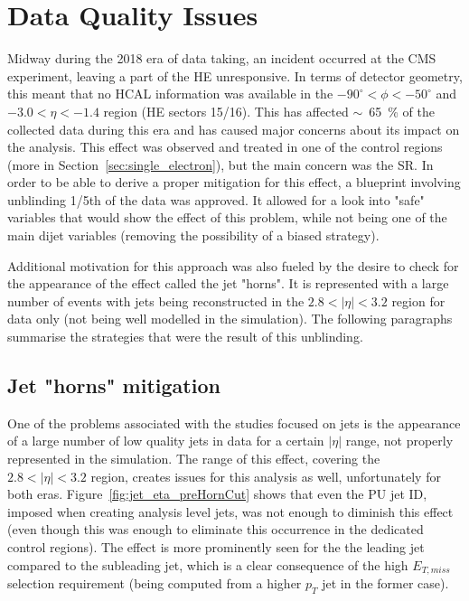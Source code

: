 \section{Data Quality Issues}
\label{sec:data_quality}
\hspace{10pt} Midway during the 2018 era of data taking, an incident occurred at the CMS experiment, leaving a part of the HE unresponsive. In terms of detector geometry, this meant that no HCAL information was available in the $-90^\circ<\phi<-50^\circ$ and $-3.0<\eta<-1.4$ region (HE sectors 15/16). This has affected $\sim$~65~\% of the collected data during this era and has caused major concerns about its impact on the analysis. This effect was observed and treated in one of the control regions (more in Section~\ref{sec:single_electron}), but the main concern was the SR. In order to be able to derive a proper mitigation for this effect, a blueprint involving unblinding 1/5th of the data was approved. It allowed for a look into "safe" variables that would show the effect of this problem, while not being one of the main dijet variables (removing the possibility of a biased strategy).

\hspace{10pt} Additional motivation for this approach was also fueled by the desire to check for the appearance of the effect called the jet "horns". It is represented with a large number of events with jets being reconstructed in the $2.8<|\eta|<3.2$ region for data only (not being well modelled in the simulation). The following paragraphs summarise the strategies that were the result of this unblinding.

\subsection{Jet "horns" mitigation}
\hspace{10pt} One of the problems associated with the studies focused on jets is the appearance of a large number of low quality jets in data for a certain $|\eta|$ range, not properly represented in the simulation. The range of this effect, covering the $2.8<|\eta|<3.2$ region, creates issues for this analysis as well, unfortunately for both eras. Figure~\ref{fig:jet_eta_preHornCut} shows that even the PU jet ID, imposed when creating analysis level jets, was not enough to diminish this effect (even though this was enough to eliminate this occurrence in the dedicated control regions). The effect is more prominently seen for the the leading jet compared to the subleading jet, which is a clear consequence of the high $E_{T,miss}$ selection requirement (being computed from a higher $p_T$ jet in the former case).


